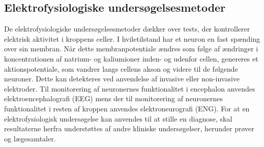 \subsection{Elektrofysiologiske undersøgelsesmetoder}
De elektrofysiologiske undersøgelsesmetoder dækker over tests, der kontrollerer elektrisk aktivitet i kroppens celler. I hviletilstand har et neuron en fast spænding over sin membran. Når dette membranpotentiale ændres som følge af ændringer i koncentrationen af natrium- og kaliumioner inden- og udenfor cellen, genereres et aktionspotentiale, som vandrer langs cellens akson og videre til de følgende neuroner. Dette kan detekteres ved anvendelse af invasive eller non-invasive elektroder. Til monitorering af neuronernes funktionalitet i encephalon anvendes elektroencephalografi (EEG) mens der til monitorering af neuronernes funktionalitet i resten af kroppen anvendes elektroneurografi (ENG). For at en elektrofysiologisk undersøgelse kan anvendes til at stille en diagnose, skal resultaterne herfra understøttes af andre kliniske undersøgelser, herunder prøver og lægesamtaler. \citep{Robinson2008} 

